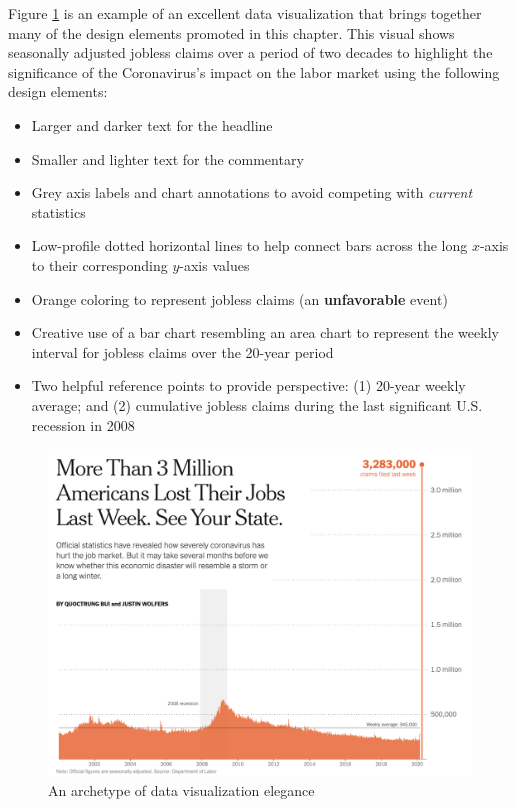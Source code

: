 \documentclass[
]{book}
\providecommand{\tightlist}{%
  \setlength{\itemsep}{0pt}\setlength{\parskip}{0pt}}
\begin{document}
Figure \ref{fig:good-viz} is an example of an excellent data visualization that brings together many of the design elements promoted in this chapter. This visual shows seasonally adjusted jobless claims over a period of two decades to highlight the significance of the Coronavirus's impact on the labor market using the following design elements:

\begin{itemize}
\tightlist
\item
  Larger and darker text for the headline
\item
  Smaller and lighter text for the commentary
\item
  Grey axis labels and chart annotations to avoid competing with \emph{current} statistics
\item
  Low-profile dotted horizontal lines to help connect bars across the long \(x\)-axis to their corresponding \(y\)-axis values
\item
  Orange coloring to represent jobless claims (an \textbf{unfavorable} event)
\item
  Creative use of a bar chart resembling an area chart to represent the weekly interval for jobless claims over the 20-year period
\item
  Two helpful reference points to provide perspective: (1) 20-year weekly average; and (2) cumulative jobless claims during the last significant U.S. recession in 2008
\end{itemize}

\begin{figure}

{\centering \includegraphics[width=1\linewidth]{graphics/good_viz-job_loss} 

}

\caption{An archetype of data visualization elegance}\label{fig:good-viz}
\end{figure}
\end{document}
